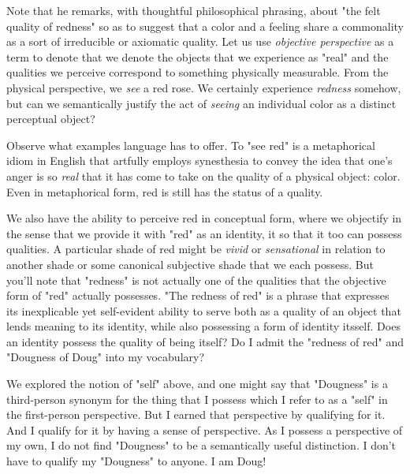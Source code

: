 \documentclass[runningheads]{llncs}
\begin{document}
Note that he remarks, with thoughtful philosophical phrasing, about "the felt quality of redness" so as to suggest that a color and a feeling share a commonality as a sort of irreducible or axiomatic quality. Let us use \textit{objective perspective} as a term to denote that we denote the objects that we experience as "real" and the qualities we perceive correspond to something physically measurable. From the physical perspective, we \textit{see} a red rose. We certainly experience \textit{redness} somehow, but can we semantically justify the act of \textit{seeing} an individual color as a distinct perceptual object?

Observe what examples language has to offer. To "see red" is a metaphorical idiom in English that artfully employs synesthesia to convey the idea that one's anger is so \textit{real} that it has come to take on the quality of a physical object: color. Even in metaphorical form, red is still has the status of a quality. 

We also have the ability to perceive red in conceptual form, where we objectify in the sense that we provide it with "red" as an identity, it so that it too can possess qualities. A particular shade of red might be \emph{vivid} or \emph{sensational} in relation to another shade or some canonical subjective shade that we each possess. But you'll note that "redness" is not actually one of the qualities that the objective form of "red" actually possesses. "The redness of red" is a phrase that expresses its inexplicable yet self-evident ability to serve both as a quality of an object that lends meaning to its identity, while also possessing a form of identity itsself. Does an identity possess the quality of being itself? Do I admit the "redness of red" and "Dougness of Doug" into my vocabulary?

We explored the notion of "self" above, and one might say that "Dougness" is a third-person synonym for the thing that I possess which I refer to as a "self" in the first-person perspective. But I earned that perspective by qualifying for it. And I qualify for it by having a sense of perspective. As I possess a perspective of my own, I do not find "Dougness" to be a semantically useful distinction. I don't have to qualify my "Dougness" to anyone. I am Doug! 
\end{document}
